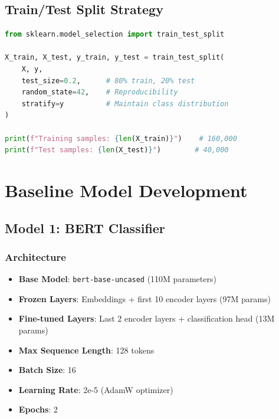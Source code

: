 \documentclass[11pt,conference]{IEEEtran}
\begin{document}
\subsection{Train/Test Split Strategy}

\begin{lstlisting}[language=Python]
from sklearn.model_selection import train_test_split

X_train, X_test, y_train, y_test = train_test_split(
    X, y,
    test_size=0.2,      # 80% train, 20% test
    random_state=42,    # Reproducibility
    stratify=y          # Maintain class distribution
)

print(f"Training samples: {len(X_train)}")    # 160,000
print(f"Test samples: {len(X_test)}")        # 40,000
\end{lstlisting}

\section{Baseline Model Development}

\subsection{Model 1: BERT Classifier}

\subsubsection{Architecture}

\begin{itemize}
    \item \textbf{Base Model}: \texttt{bert-base-uncased} (110M parameters)
    \item \textbf{Frozen Layers}: Embeddings + first 10 encoder layers (97M params)
    \item \textbf{Fine-tuned Layers}: Last 2 encoder layers + classification head (13M params)
    \item \textbf{Max Sequence Length}: 128 tokens
    \item \textbf{Batch Size}: 16
    \item \textbf{Learning Rate}: 2e-5 (AdamW optimizer)
    \item \textbf{Epochs}: 2
\end{itemize}
\end{document}
